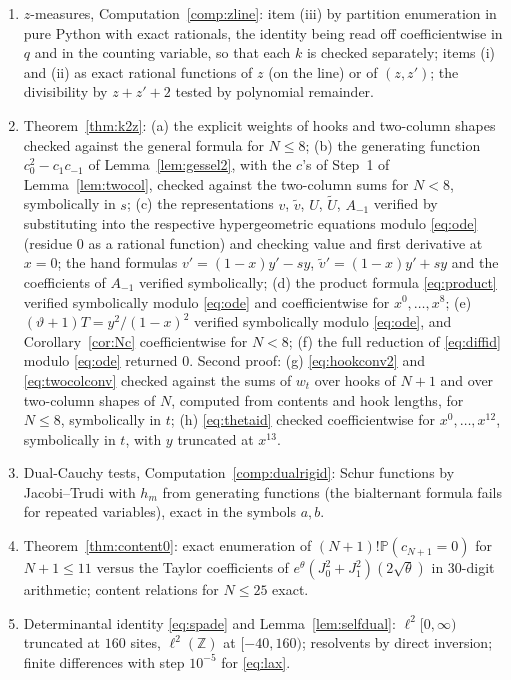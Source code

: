 \documentclass[11pt]{article}
\theoremstyle{definition}
\theoremstyle{remark}
\newcommand{\Z}{\mathbb{Z}}
\newcommand{\Prob}{\mathbb{P}}
\begin{document}
\begin{enumerate}[label=(P\arabic*),leftmargin=3em]
\item $z$-measures, Computation~\ref{comp:zline}: item (iii) by partition enumeration in pure Python with exact rationals, the identity being read off coefficientwise in $q$ and in the counting variable, so that each $k$ is checked separately; items (i) and (ii) as exact rational functions of $z$ (on the line) or of $(z,z')$; the divisibility by $z+z'+2$ tested by polynomial remainder.
\item\label{prov:k2z} Theorem~\ref{thm:k2z}: (a) the explicit weights of hooks and two-column shapes checked against the general formula for $N\le8$; (b) the generating function $c_0^2-c_1c_{-1}$ of Lemma~\ref{lem:gessel2}, with the $c$'s of Step~1 of Lemma~\ref{lem:twocol}, checked against the two-column sums for $N<8$, symbolically in $s$; (c) the representations $v$, $\tilde v$, $U$, $\tilde U$, $A_{-1}$ verified by substituting into the respective hypergeometric equations modulo \eqref{eq:ode} (residue $0$ as a rational function) and checking value and first derivative at $x=0$; the hand formulas $v'=(1-x)y'-sy$, $\tilde v'=(1-x)y'+sy$ and the coefficients of $A_{-1}$ verified symbolically; (d) the product formula \eqref{eq:product} verified symbolically modulo \eqref{eq:ode} and coefficientwise for $x^0,\dots,x^8$; (e) $(\vartheta+1)T=y^2/(1-x)^2$ verified symbolically modulo \eqref{eq:ode}, and Corollary~\ref{cor:Nc} coefficientwise for $N<8$; (f) the full reduction of \eqref{eq:diffid} modulo \eqref{eq:ode} returned $0$. Second proof: (g) \eqref{eq:hookconv2} and \eqref{eq:twocolconv} checked against the sums of $w_t$ over hooks of $N+1$ and over two-column shapes of $N$, computed from contents and hook lengths, for $N\le8$, symbolically in $t$; (h) \eqref{eq:thetaid} checked coefficientwise for $x^0,\dots,x^{12}$, symbolically in $t$, with $y$ truncated at $x^{13}$.
\item Dual-Cauchy tests, Computation~\ref{comp:dualrigid}: Schur functions by Jacobi--Trudi with $h_m$ from generating functions (the bialternant formula fails for repeated variables), exact in the symbols $a,b$.
\item Theorem~\ref{thm:content0}: exact enumeration of $(N+1)!\Prob(c_{N+1}=0)$ for $N+1\le11$ versus the Taylor coefficients of $e^\theta(J_0^2+J_1^2)(2\sqrt\theta)$ in $30$-digit arithmetic; content relations for $N\le25$ exact.
\item Determinantal identity \eqref{eq:spade} and Lemma~\ref{lem:selfdual}: $\ell^2[0,\infty)$ truncated at $160$ sites, $\ell^2(\Z)$ at $[-40,160)$; resolvents by direct inversion; finite differences with step $10^{-5}$ for \eqref{eq:lax}.

\end{enumerate}
\end{document}
